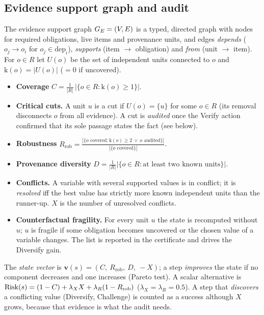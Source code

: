 \subsection{Evidence support graph and audit}
The evidence support graph $G_E=(V,E)$ is a typed, directed graph with nodes for required obligations, live items and provenance units,
and edges \emph{depends} ($o_j\!\to\! o_i$ for $o_j\in\mathrm{dep}_i$), \emph{supports} (item $\to$ obligation) and \emph{from} (unit $\to$ item).
For $o\in R$ let $U(o)$ be the set of independent units connected to $o$ and $\mathrm{k}(o)=|U(o)|$ ($=0$ if uncovered).
\begin{itemize}[leftmargin=1.2em,itemsep=1pt]
 \item \textbf{Coverage} $C=\frac1{|R|}\,|\{o\in R:\mathrm{k}(o)\ge1\}|$.
 \item \textbf{Critical cuts.} A unit $u$ is a cut if $U(o)=\{u\}$ for some $o\in R$ (its removal disconnects $o$ from all evidence). A cut is
  \emph{audited} once the Verify action confirmed that its sole passage states the fact (see below).
 \item \textbf{Robustness} $R_{\mathrm{rob}}=\frac{|\{o \text{ covered}: \mathrm{k}(o)\ge2\ \vee\ o\text{ audited}\}|}{|\{o\text{ covered}\}|}$.
 \item \textbf{Provenance diversity} $D=\frac1{|R|}|\{o\in R: \text{at least two known units}\}|$.
 \item \textbf{Conflicts.} A variable with several supported values is in conflict; it is \emph{resolved} iff the best value has strictly more known
  independent units than the runner-up. $X$ is the number of unresolved conflicts.
 \item \textbf{Counterfactual fragility.} For every unit $u$ the state is recomputed without $u$; $u$ is fragile if some obligation becomes uncovered
  or the chosen value of a variable changes. The list is reported in the certificate and drives the Diversify gain.
\end{itemize}
The \emph{state vector} is $\mathbf v(s)=(C,\ R_{\mathrm{rob}},\ D,\ -X)$; a step \emph{improves} the state if no component decreases and one increases (Pareto
test). A scalar alternative is $\mathrm{Risk}(s)=(1-C)+\lambda_X X+\lambda_R(1-R_{\mathrm{rob}})$ ($\lambda_X=\lambda_R=0.5$). A step that \emph{discovers} a conflicting value
(Diversify, Challenge) is counted as a success although $X$ grows, because that evidence is what the audit needs.

